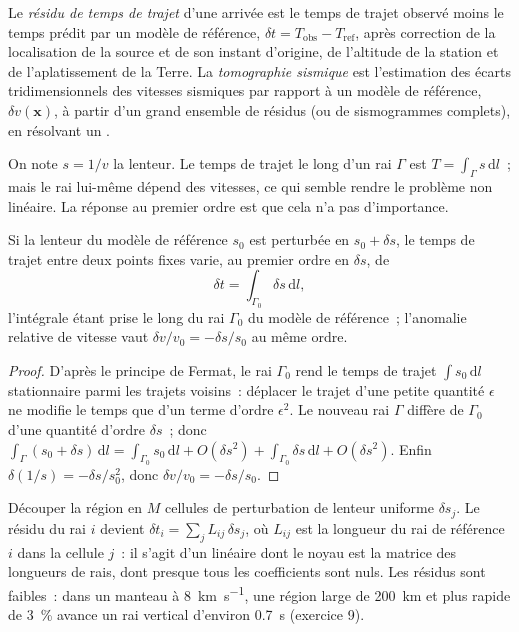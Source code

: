 \begin{definition}\label{def:b3:seismology-imaging:tomography}
Le \emph{résidu de temps de trajet} d'une arrivée est le
temps de trajet observé moins le temps prédit par un modèle de référence,
$\delta t = T_{\text{obs}} - T_{\text{ref}}$, après correction de la localisation
de la source et de son instant d'origine, de l'altitude de la station et de
l'aplatissement de la Terre. La \emph{tomographie sismique} est
l'estimation des écarts tridimensionnels des vitesses sismiques par rapport à un
modèle de référence, $\delta v(\mathbf x)$, à partir d'un grand ensemble de résidus
(ou de sismogrammes complets), en résolvant un .
\end{definition}

On note $s = 1/v$ la lenteur. Le temps de trajet le long d'un rai $\Gamma$ est
$T = \int_\Gamma s\,\mathrm dl$~; mais le rai lui-même dépend des vitesses,
ce qui semble rendre le problème non linéaire. La réponse au premier ordre est que
cela n'a pas d'importance.

\begin{proposition}\label{prop:b3:seismology-imaging:linear}
Si la lenteur du modèle de référence $s_0$ est perturbée en $s_0 + \delta s$,
le temps de trajet entre deux points fixes varie, au premier ordre en
$\delta s$, de
\[
  \delta t = \int_{\Gamma_0}\delta s\,\mathrm dl ,
\]
l'intégrale étant prise le long du rai $\Gamma_0$ du modèle de référence~; l'anomalie
relative de vitesse vaut $\delta v/v_0 = -\delta s/s_0$ au même ordre.
\end{proposition}

\begin{proof}
D'après le principe de Fermat, le rai $\Gamma_0$ rend le temps de trajet
$\int s_0\,\mathrm dl$ stationnaire parmi les trajets voisins~: déplacer le trajet
d'une petite quantité $\epsilon$ ne modifie le temps que d'un terme d'ordre $\epsilon^2$.
Le nouveau rai $\Gamma$ diffère de $\Gamma_0$ d'une quantité d'ordre $\delta s$~;
donc $\int_\Gamma(s_0 + \delta s)\,\mathrm dl = \int_{\Gamma_0}s_0\,\mathrm dl +
O(\delta s^2) + \int_{\Gamma_0}\delta s\,\mathrm dl + O(\delta s^2)$. Enfin
$\delta(1/s) = -\delta s/s_0^2$, donc $\delta v/v_0 = -\delta s/s_0$.
\end{proof}

Découper la région en $M$ cellules de perturbation de lenteur uniforme $\delta s_j$.
Le résidu du rai $i$ devient $\delta t_i = \sum_j L_{ij}\,\delta s_j$, où
$L_{ij}$ est la longueur du rai de référence $i$ dans la cellule $j$~: il s'agit d'un
 linéaire dont le noyau est la matrice des longueurs de rais, dont presque
tous les coefficients sont nuls. Les résidus sont faibles~: dans un manteau à
\qty{8}{km.s^{-1}}, une région large de \qty{200}{km} et plus rapide de
\qty{3}{\percent} avance un rai vertical d'environ \qty{0.7}{s} (exercice 9).

